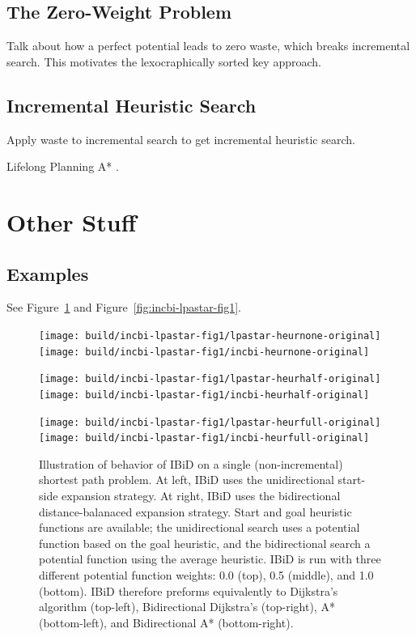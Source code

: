 \subsection{The Zero-Weight Problem}

Talk about how a perfect potential leads to zero waste,
which breaks incremental search.
This motivates the lexocraphically sorted key approach.

\subsection{Incremental Heuristic Search}

Apply waste to incremental search to get
incremental heuristic search.

Lifelong Planning A* \citep{koenig2004lpastar}.

\section{Other Stuff}

\subsection{Examples}

See Figure~\ref{fig:incbi-lpastar-fig1-heurchange}
and Figure~\ref{fig:incbi-lpastar-fig1}.

\begin{figure}
   \centering%
   
   \texttt{[image: build/incbi-lpastar-fig1/lpastar-heurnone-original]}%
   \;\;%
   \texttt{[image: build/incbi-lpastar-fig1/incbi-heurnone-original]}%
   
   \vspace{0.2cm}
   
   \texttt{[image: build/incbi-lpastar-fig1/lpastar-heurhalf-original]}%
   \;\;%
   \texttt{[image: build/incbi-lpastar-fig1/incbi-heurhalf-original]}%
   
   \vspace{0.2cm}
   
   \texttt{[image: build/incbi-lpastar-fig1/lpastar-heurfull-original]}%
   \;\;%
   \texttt{[image: build/incbi-lpastar-fig1/incbi-heurfull-original]}%
   
   \caption{Illustration of behavior of IBiD on a single
      (non-incremental) shortest path problem.
      At left, IBiD uses the unidirectional start-side expansion
      strategy.
      At right, IBiD uses the bidirectional distance-balanaced
      expansion strategy.
      Start and goal heuristic functions are available;
      the unidirectional search uses a potential function based
      on the goal heuristic,
      and the bidirectional search a potential function using
      the average heuristic.
      IBiD is run with three different potential function weights:
      0.0 (top), 0.5 (middle), and 1.0 (bottom).
      IBiD therefore preforms equivalently to
      Dijkstra's algorithm (top-left),
      Bidirectional Dijkstra's (top-right),
      A* (bottom-left),
      and Bidirectional A* (bottom-right).}
   \label{fig:incbi-lpastar-fig1-heurchange}
\end{figure}

